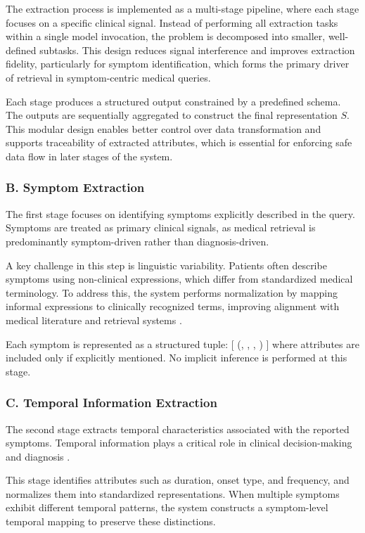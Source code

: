 \documentclass[conference, anonymous]{IEEEtran}
\begin{document}
The extraction process is implemented as a multi-stage pipeline, where each stage focuses on a specific clinical signal. Instead of performing all extraction tasks within a single model invocation, the problem is decomposed into smaller, well-defined subtasks. This design reduces signal interference and improves extraction fidelity, particularly for symptom identification, which forms the primary driver of retrieval in symptom-centric medical queries.

Each stage produces a structured output constrained by a predefined schema. The outputs are sequentially aggregated to construct the final representation $S$. This modular design enables better control over data transformation and supports traceability of extracted attributes, which is essential for enforcing safe data flow in later stages of the system.

\subsubsection{B. Symptom Extraction}

The first stage focuses on identifying symptoms explicitly described in the query. Symptoms are treated as primary clinical signals, as medical retrieval is predominantly symptom-driven rather than diagnosis-driven.

A key challenge in this step is linguistic variability. Patients often describe symptoms using non-clinical expressions, which differ from standardized medical terminology. To address this, the system performs normalization by mapping informal expressions to clinically recognized terms, improving alignment with medical literature and retrieval systems \cite{devlin2019bert}.

Each symptom is represented as a structured tuple:
[
(, , , )
]
where attributes are included only if explicitly mentioned. No implicit inference is performed at this stage.

\subsubsection{C. Temporal Information Extraction}

The second stage extracts temporal characteristics associated with the reported symptoms. Temporal information plays a critical role in clinical decision-making and diagnosis \cite{rajkomar2018}.

This stage identifies attributes such as duration, onset type, and frequency, and normalizes them into standardized representations. When multiple symptoms exhibit different temporal patterns, the system constructs a symptom-level temporal mapping to preserve these distinctions.
\end{document}
